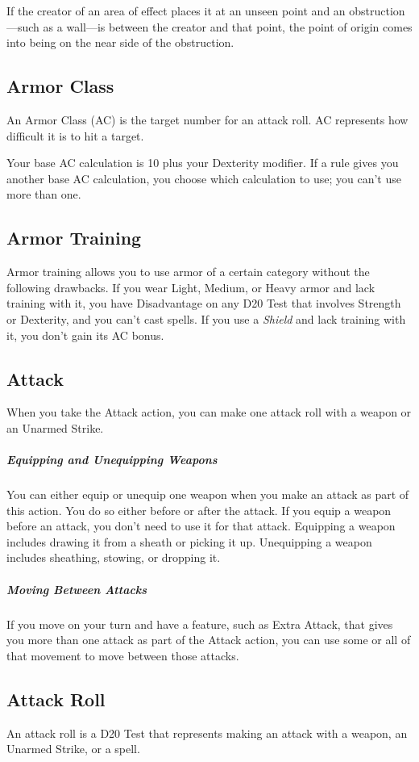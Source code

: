 \documentclass[10pt,a4paper,twoside,bg=print,twocolumn,openany,nodeprecatedcode]{dndarticle}
\begin{document}
If the creator of an area of effect places it at an unseen point and an obstruction—such as a wall—is between the creator and that point, the point of origin comes into being on the near side of the obstruction.

\subsection{Armor Class}
An Armor Class (AC) is the target number for an attack roll. AC represents how difficult it is to hit a target.

Your base AC calculation is 10 plus your Dexterity modifier. If a rule gives you another base AC calculation, you choose which calculation to use; you can't use more than one.

\subsection{Armor Training}
Armor training allows you to use armor of a certain category without the following drawbacks. If you wear Light, Medium, or Heavy armor and lack training with it, you have Disadvantage on any D20 Test that involves Strength or Dexterity, and you can't cast spells. If you use a \textit{Shield} and lack training with it, you don't gain its AC bonus.

\subsection{Attack}
When you take the Attack action, you can make one attack roll with a weapon or an Unarmed Strike.

\subparagraph{Equipping and Unequipping Weapons}
You can either equip or unequip one weapon when you make an attack as part of this action. You do so either before or after the attack. If you equip a weapon before an attack, you don't need to use it for that attack. Equipping a weapon includes drawing it from a sheath or picking it up. Unequipping a weapon includes sheathing, stowing, or dropping it.

\subparagraph{Moving Between Attacks}
If you move on your turn and have a feature, such as Extra Attack, that gives you more than one attack as part of the Attack action, you can use some or all of that movement to move between those attacks.

\subsection{Attack Roll}
An attack roll is a D20 Test that represents making an attack with a weapon, an Unarmed Strike, or a spell.
\end{document}

